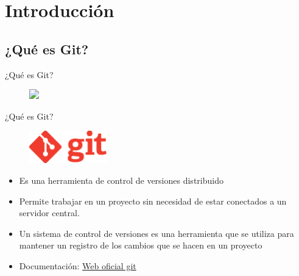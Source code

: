 \documentclass{beamer}
\begin{document}
\section{Introducción} 

\subsection{¿Qué es Git?}

\begin{frame}{¿Qué es Git?}

  \begin{figure}
    \includegraphics<1->[width=0.8\textwidth]{images/cap-one.png}
  \end{figure}


\end{frame}


\begin{frame}{¿Qué es Git?}
  \begin{figure}
    \includegraphics[width = 0.3\textwidth]{images/logo_git.png}
  \end{figure}

  \begin{itemize}[<+->]
    \item Es una herramienta de control de versiones distribuido
    \item Permite trabajar en un proyecto sin necesidad de estar
    conectados a un servidor central.
    \item Un sistema de control de versiones es una herramienta que se utiliza para mantener un registro de los cambios que se hacen en un proyecto
    \item Documentación: \href{https://git-scm.com}{Web oficial git} 
  \end{itemize}

\end{frame}

\end{document}
